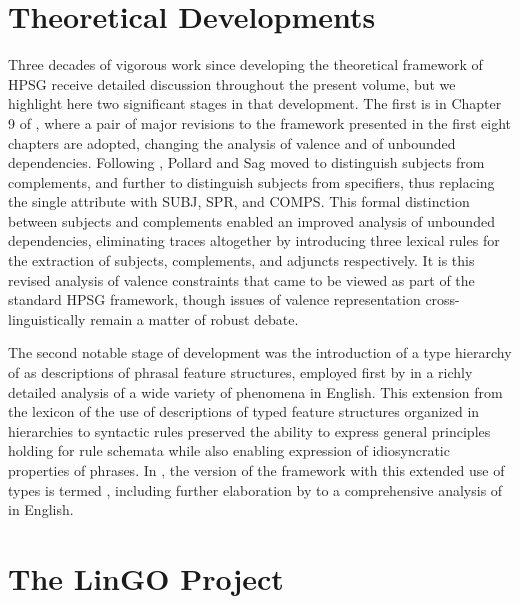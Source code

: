 \documentclass[output=paper
                ,modfonts
                ,nonflat
	        ,collection
	        ,collectionchapter
	        ,collectiontoclongg
 	        ,biblatex
                ,babelshorthands
                ,newtxmath
                ,draftmode
                ,colorlinks, citecolor=brown
]{./langsci/langscibook}
\begin{document}
\section{Theoretical Developments}

Three decades of vigorous work since \cite{ps} developing the theoretical framework of HPSG receive detailed discussion throughout the present volume, but we highlight here two significant stages in that development.  The first is in Chapter 9 of \cite{ps2}, where a pair of major revisions to the framework presented in the first eight chapters are adopted, changing the analysis of valence and of unbounded dependencies.  Following \citet{Borsley87a,Borsley88b-u,Borsley89,Borsley90a}, Pollard and Sag moved to distinguish subjects from complements, and further to distinguish subjects from specifiers, thus replacing the single \subcat attribute with SUBJ, SPR, and COMPS.  This formal distinction between subjects and complements enabled an improved analysis of unbounded dependencies, eliminating traces altogether by introducing three lexical rules for the extraction of subjects, complements, and adjuncts respectively.   It is this revised analysis of valence constraints that came to be viewed as part of the standard HPSG framework, though issues of valence representation cross-linguistically remain a matter of robust debate.

The second notable stage of development was the introduction of a type hierarchy of {\em {}} as descriptions of phrasal feature structures, employed first by \citet{Sag97a} in a richly detailed analysis of a wide variety of  phenomena in English.  This extension from the lexicon of the use of descriptions of typed feature structures organized in hierarchies to syntactic rules preserved the ability to express general principles holding for rule schemata while also enabling expression of idiosyncratic properties of phrases.  In , the version of the framework with this extended use of types is termed {\em {}}, including further elaboration by \citet{GSag2000a-u} to a comprehensive analysis of  in English.  

\section{The LinGO Project}
\end{document}
